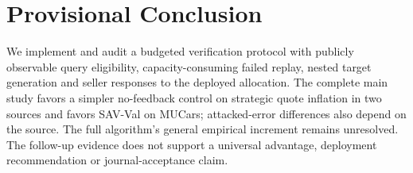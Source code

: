 \section{Provisional Conclusion}
We implement and audit a budgeted verification protocol with publicly
observable query eligibility, capacity-consuming failed replay, nested
target generation and seller responses to the deployed allocation.
The complete main study favors a simpler no-feedback control on strategic
quote inflation in two sources and favors SAV-Val on MUCars;
attacked-error differences also depend on the source. The full algorithm's
general empirical increment remains unresolved. The follow-up evidence
does not support a universal advantage, deployment
recommendation or journal-acceptance claim.
